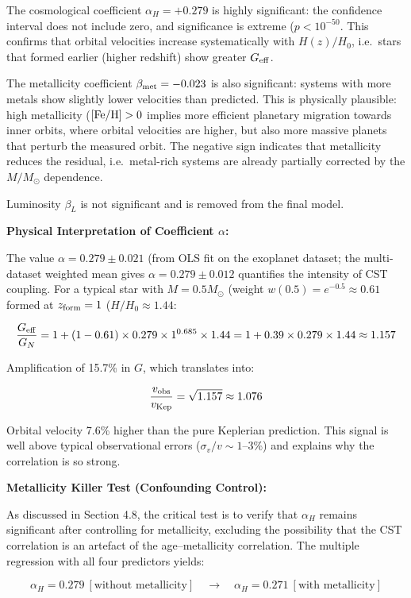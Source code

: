 \documentclass[10pt,a4paper]{article}
\begin{document}
The cosmological coefficient \(\alpha_H = +0.279\) is highly
significant: the confidence interval does not include zero, and
significance is extreme (\(p < 10^{-50}\). This confirms that orbital
velocities increase systematically with \(H(z)/H_0\), i.e.~stars that
formed earlier (higher redshift) show greater \(G_{\rm eff}\).

The metallicity coefficient \(\beta_{\rm met} = -0.023\) is also
significant: systems with more metals show slightly lower velocities
than predicted. This is physically plausible: high metallicity
(\([{\rm Fe/H}] > 0\) implies more efficient planetary migration
towards inner orbits, where orbital velocities are higher, but also more
massive planets that perturb the measured orbit. The negative sign
indicates that metallicity reduces the residual, i.e.~metal-rich systems
are already partially corrected by the \(M/M_\odot\) dependence.

Luminosity \(\beta_L\) is not significant and is removed from the final
model.

\textbf{Physical Interpretation of Coefficient \(\alpha\):}

The value \(\alpha = 0.279 \pm 0.021\) (from OLS fit on the exoplanet
dataset; the multi-dataset weighted mean gives
\(\alpha = 0.279 \pm 0.012\) quantifies the intensity of CST coupling.
For a typical star with \(M = 0.5 M_\odot\) (weight
\(w(0.5) = e^{-0.5} \approx 0.61\) formed at \(z_{\rm form} = 1\)
(\(H/H_0 \approx 1.44\):

\[\frac{G_{\rm eff}}{G_N} = 1 + (1-0.61) \times 0.279 \times 1^{0.685} \times 1.44 = 1 + 0.39 \times 0.279 \times 1.44 \approx 1.157\]

Amplification of 15.7\% in \(G\), which translates into:

\[\frac{v_{\rm obs}}{v_{\rm Kep}} = \sqrt{1.157} \approx 1.076\]

Orbital velocity 7.6\% higher than the pure Keplerian prediction. This
signal is well above typical observational errors
(\(\sigma_v/v \sim 1\)--3\%) and explains why the correlation is so
strong.

\textbf{Metallicity Killer Test (Confounding Control):}

As discussed in Section 4.8, the critical test is to verify that
\(\alpha_H\) remains significant after controlling for metallicity,
excluding the possibility that the CST correlation is an artefact of the
age--metallicity correlation. The multiple regression with all four
predictors yields:

\[\alpha_H = 0.279~[\text{without metallicity}] \quad\to\quad \alpha_H = 0.271~[\text{with metallicity}]\]
\end{document}
